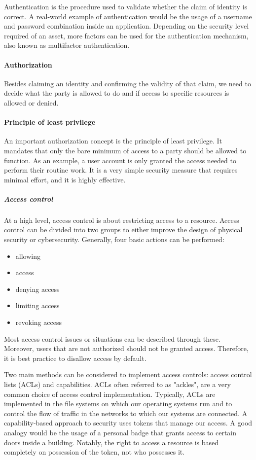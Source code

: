 Authentication is the procedure used to validate whether the claim of identity is correct. A real-world example of authentication would be the usage of a username and password combination inside an application. Depending on the security level required of an asset, more factors can be used for the authentication mechanism, also known as multifactor authentication.

\paragraph{Authorization}
Besides claiming an identity and confirming the validity of that claim, we need to decide what the party is allowed to do and if access to specific resources is allowed or denied. 

\paragraph{Principle of least privilege}
An important authorization concept is the principle of least privilege. It mandates that only the bare minimum of access to a party should be allowed to function. As an example, a user account is only granted the access needed to perform their routine work. It is a very simple security measure that requires minimal effort, and it is highly effective.

\subparagraph{Access control}
At a high level, access control is about restricting access to a resource. Access control can be divided into two groups to either improve the design of physical security or cybersecurity. Generally, four basic actions can be performed: 
\begin{itemize}
    \item allowing
    \item access
    \item denying access
    \item limiting access
    \item revoking access
\end{itemize}
Most access control issues or situations can be described through these. Moreover, users that are not authorized should not be granted access. Therefore, it is best practice to disallow access by default.

Two main methods can be considered to implement access controls: access control lists (ACLs) and capabilities. ACLs often referred to as "ackles", are a very common choice of access control implementation. Typically, ACLs are implemented in the file systems on which our operating systems run and to control the flow of traffic in the networks to which our systems are connected. A capability-based approach to security uses tokens that manage our access. A good analogy would be the usage of a personal badge that grants access to certain doors inside a building. Notably, the right to access a resource is based completely on possession of the token, not who possesses it.

